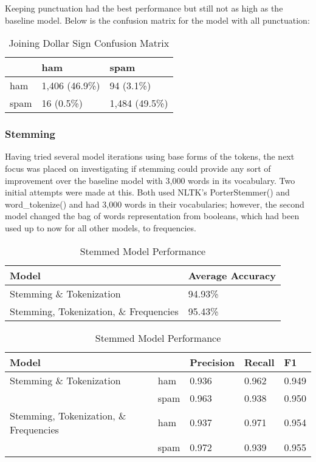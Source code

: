 \documentclass[a4paper]{article}
\begin{document}
	Keeping punctuation had the best performance but still not as high as the baseline model. Below is the confusion matrix for the model with all punctuation:
	
	\begin{table}[H]
		\centering
		\caption{Joining Dollar Sign Confusion Matrix}
		\begin{tabular}{l|ll}
			& ham & spam \\
			\hline
			ham & 1,406 (46.9\%) & 94 (3.1\%) \\
			spam & 16 (0.5\%) & 1,484 (49.5\%)
		\end{tabular}
	\end{table}

	\subsubsection{Stemming}
	
	Having tried several model iterations using base forms of the tokens, the next focus was placed on investigating if stemming could provide any sort of improvement over the baseline model with 3,000 words in its vocabulary. Two initial attempts were made at this. Both used NLTK’s PorterStemmer() and word\_tokenize() and had 3,000 words in their vocabularies; however, the second model changed the bag of words representation from booleans, which had been used up to now for all other models, to frequencies.
	
	\begin{table}[H]
		\centering
		\caption{Stemmed Model Performance}
		\begin{tabular}{ll}
			Model & Average Accuracy \\
			\hline
			Stemming \& Tokenization & 94.93\% \\
			Stemming, Tokenization, \& Frequencies & 95.43\%
		\end{tabular}
		\begin{tabular}{l|llll}
			\hline
			\hline
			Model & & Precision & Recall & F1 \\
			\hline
			Stemming \& Tokenization & ham  & 0.936 & 0.962 & 0.949 \\
			& spam & 0.963 & 0.938 & 0.950 \\
			\hline
			Stemming, Tokenization, \& Frequencies & ham  & 0.937 & 0.971 & 0.954 \\
			& spam & 0.972 & 0.939 & 0.955
		\end{tabular}
	\end{table}
	
\end{document}
